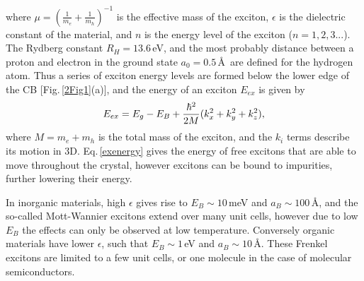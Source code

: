where $\mu = (\frac{1}{m_e}+\frac{1}{m_h})^{-1}$ is the effective mass of the exciton, $\epsilon$ is the dielectric constant of the material, and $n$ is the energy level of the exciton ($n=1, 2, 3...$). The Rydberg constant $R_H=13.6$\,eV, and the most probably distance between a proton and electron in the ground state $a_0=0.5$\,\AA\, are defined for the hydrogen atom. Thus a series of exciton energy levels are formed below the lower edge of the CB [Fig.\,\ref{2Fig1}(a)], and the energy of an exciton $E_{ex}$ is given by
\begin{equation}
\centering
E_{ex} = E_g - E_B + \frac{\hbar^2}{2M}(k_x^2+k_y^2+k_z^2),
\label{exenergy}
\end{equation}
where $M = m_e+m_h$ is the total mass of the exciton, and the $k_i$ terms describe its motion in 3D. Eq.\,\ref{exenergy} gives the energy of free excitons that are able to move throughout the crystal, however excitons can be bound to impurities, further lowering their energy.

In inorganic materials, high $\epsilon$ gives rise to $E_B \sim 10$\,meV and $a_B \sim 100$\,\AA, and the so-called Mott-Wannier excitons extend over many unit cells, however due to low $E_B$ the effects can only be observed at low temperature. Conversely organic materials have lower $\epsilon$, such that $E_B \sim 1$\,eV and $a_B \sim 10$\,\AA. These Frenkel excitons are limited to a few unit cells, or one molecule in the case of molecular semiconductors.

